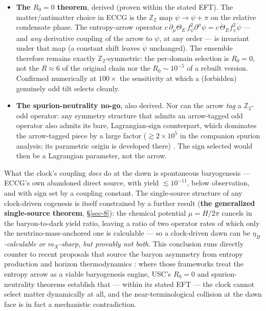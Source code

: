 \documentclass[submission, Phys]{SciPost}
\providecommand{\tightlist}{\setlength{\itemsep}{0pt}\setlength{\parskip}{0pt}}
\begin{document}
\begin{itemize}
\tightlist
\item
  \textbf{The \(R_0 = 0\) theorem}, derived (proven within the stated
  EFT). The matter/antimatter choice in ECCG is the \(\mathbb{Z}_2\) map
  \(\psi \to \psi + \pi\) on the relative condensate phase. The
  entropy-arrow operator
  \(c\,\partial_\mu\Theta_E\, f_\psi^2 \partial^\mu\psi = c\,\dot\Theta_E f_\psi^2\dot\psi\)
  --- and \emph{any} derivative coupling of the arrow to \(\psi\), at
  any order --- is invariant under that map (a constant shift leaves
  \(\dot\psi\) unchanged). The ensemble therefore remains exactly
  \(\mathbb{Z}_2\)-symmetric: the per-domain selection is \(R_0 = 0\),
  not the \(R\approx 6\) of the original chain nor the
  \(R_0 \sim 10^{-5}\) of a rebuilt version. Confirmed numerically at
  \(100\times\) the sensitivity at which a (forbidden) genuinely odd
  tilt selects cleanly.
\item
  \textbf{The spurion-neutrality no-go}, also derived. Nor can the arrow
  \emph{tag} a \(\mathbb{Z}_2\)-odd operator: any symmetry structure
  that admits an arrow-tagged odd operator also admits its bare,
  Lagrangian-sign counterpart, which dominates the arrow-tagged piece by
  a large factor (\(\gtrsim 2\times 10^5\) in the companion spurion
  analysis; its parametric origin is developed there)
  \cite{Dasgupta:2018eha}. The sign selected would then be a Lagrangian
  parameter, not the arrow.
\end{itemize}

What the clock's coupling \emph{does} do at the dawn is spontaneous
baryogenesis \cite{Cohen:1987vi} --- ECCG's own abandoned direct
source, with yield \(\lesssim 10^{-11}\), below observation, and with
sign set by a coupling constant. The single-source structure of any
clock-driven cogenesis is itself constrained by a further result
(\textbf{the generalized single-source theorem}, §\ref{sec-8}): the
chemical potential \(\mu = H/2\pi\) cancels in the baryon-to-dark yield
ratio, leaving a ratio of two operator rates of which only the
neutrino-mass-anchored one is calculable --- so a clock-driven dawn can
be \emph{\(\eta_B\)-calculable or \(m_X\)-sharp, but provably not both}.
This conclusion runs directly counter to recent proposals that source
the baryon asymmetry from entropy production and horizon thermodynamics
\cite{Mandel:2026azt, Luciano:2025fqg}: where those frameworks treat
the entropy arrow as a viable baryogenesis engine, USC's \(R_0 = 0\) and
spurion-neutrality theorems establish that --- within its stated EFT ---
the clock cannot select matter dynamically at all, and the
near-terminological collision at the dawn face is in fact a mechanistic
contradiction.
\end{document}
